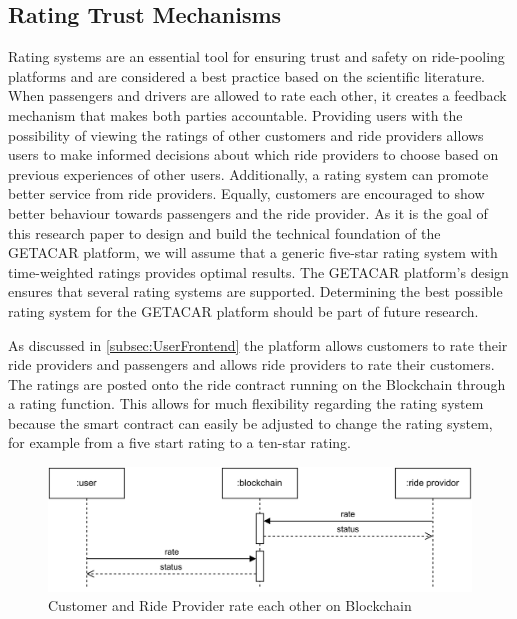 \subsection{Rating Trust Mechanisms}\label{subsec:RatingTrustMechanisms}
Rating systems are an essential tool for ensuring trust and safety on ride-pooling platforms and are considered a best practice based on the scientific literature. When passengers and drivers are allowed to rate each other, it creates a feedback mechanism that makes both parties accountable. Providing users with the possibility of viewing the ratings of other customers and ride providers allows users to make informed decisions about which ride providers to choose based on previous experiences of other users. Additionally, a rating system can promote better service from ride providers. Equally, customers are encouraged to show better behaviour towards passengers and the ride provider. As it is the goal of this research paper to design and build the technical foundation of the GETACAR platform, we will assume that a generic five-star rating system with time-weighted ratings provides optimal results. The GETACAR platform's design ensures that several rating systems are supported. Determining the best possible rating system for the GETACAR platform should be part of future research. 

As discussed in \ref{subsec:UserFrontend} the platform allows customers to rate their ride providers and passengers and allows ride providers to rate their customers. The ratings are posted onto the ride contract running on the Blockchain through a rating function. This allows for much flexibility regarding the rating system because the smart contract can easily be adjusted to change the rating system, for example from a five start rating to a ten-star rating. 

\begin{figure}[h]
    \centering
    \includegraphics[width=\linewidth]{data/6.svg}
    \caption{Customer and Ride Provider rate each other on Blockchain}
    \label{fig:directSVG}
\end{figure}


